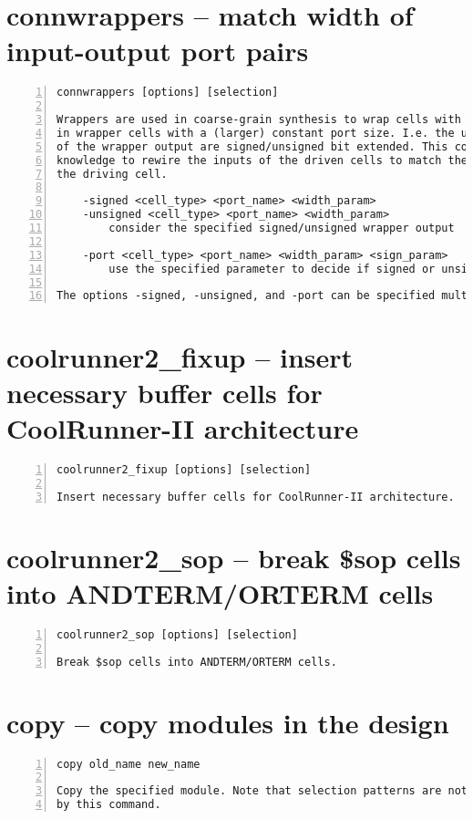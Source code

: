 \section{connwrappers -- match width of input-output port pairs}
\label{cmd:connwrappers}
\begin{lstlisting}[numbers=left,frame=single]
    connwrappers [options] [selection]

Wrappers are used in coarse-grain synthesis to wrap cells with smaller ports
in wrapper cells with a (larger) constant port size. I.e. the upper bits
of the wrapper output are signed/unsigned bit extended. This command uses this
knowledge to rewire the inputs of the driven cells to match the output of
the driving cell.

    -signed <cell_type> <port_name> <width_param>
    -unsigned <cell_type> <port_name> <width_param>
        consider the specified signed/unsigned wrapper output

    -port <cell_type> <port_name> <width_param> <sign_param>
        use the specified parameter to decide if signed or unsigned

The options -signed, -unsigned, and -port can be specified multiple times.
\end{lstlisting}

\section{coolrunner2\_fixup -- insert necessary buffer cells for CoolRunner-II architecture}
\label{cmd:coolrunner2_fixup}
\begin{lstlisting}[numbers=left,frame=single]
    coolrunner2_fixup [options] [selection]

Insert necessary buffer cells for CoolRunner-II architecture.
\end{lstlisting}

\section{coolrunner2\_sop -- break \$sop cells into ANDTERM/ORTERM cells}
\label{cmd:coolrunner2_sop}
\begin{lstlisting}[numbers=left,frame=single]
    coolrunner2_sop [options] [selection]

Break $sop cells into ANDTERM/ORTERM cells.
\end{lstlisting}

\section{copy -- copy modules in the design}
\label{cmd:copy}
\begin{lstlisting}[numbers=left,frame=single]
    copy old_name new_name

Copy the specified module. Note that selection patterns are not supported
by this command.
\end{lstlisting}

